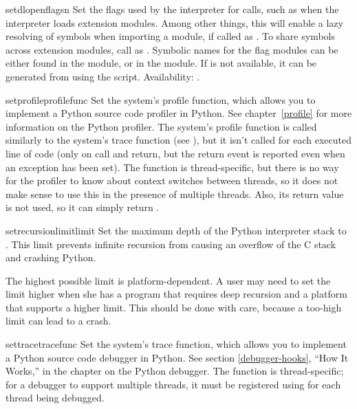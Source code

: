 \begin{funcdesc}{setdlopenflags}{n}
  Set the flags used by the interpreter for 
  calls, such as when the interpreter loads extension modules.  Among
  other things, this will enable a lazy resolving of symbols when
  importing a module, if called as .  To
  share symbols across extension modules, call as
  .  Symbolic
  names for the flag modules can be either found in the 
  module, or in the  module. If  is not
  available, it can be generated from 
  using the  script.
  Availability: \UNIX.
\end{funcdesc}

\begin{funcdesc}{setprofile}{profilefunc}
  Set the system's profile function, which
  allows you to implement a Python source code profiler in
  Python.  See chapter~\ref{profile} for more
  information on the Python profiler.  The system's profile function
  is called similarly to the system's trace function (see
  ), but it isn't called for each executed line
  of code (only on call and return, but the return event is reported
  even when an exception has been set).  The function is
  thread-specific, but there is no way for the profiler to know about
  context switches between threads, so it does not make sense to use
  this in the presence of multiple threads.
  Also, its return value is not used, so it can simply return
  .
\end{funcdesc}

\begin{funcdesc}{setrecursionlimit}{limit}
  Set the maximum depth of the Python interpreter stack to
  .  This limit prevents infinite recursion from causing an
  overflow of the C stack and crashing Python.

  The highest possible limit is platform-dependent.  A user may need
  to set the limit higher when she has a program that requires deep
  recursion and a platform that supports a higher limit.  This should
  be done with care, because a too-high limit can lead to a crash.
\end{funcdesc}

\begin{funcdesc}{settrace}{tracefunc}
  Set the system's trace function, which allows
  you to implement a Python source code debugger in Python.  See
  section \ref{debugger-hooks}, ``How It Works,'' in the chapter on
  the Python debugger.  The function is
  thread-specific; for a debugger to support multiple threads, it must
  be registered using  for each thread being
  debugged.  
\end{funcdesc}

